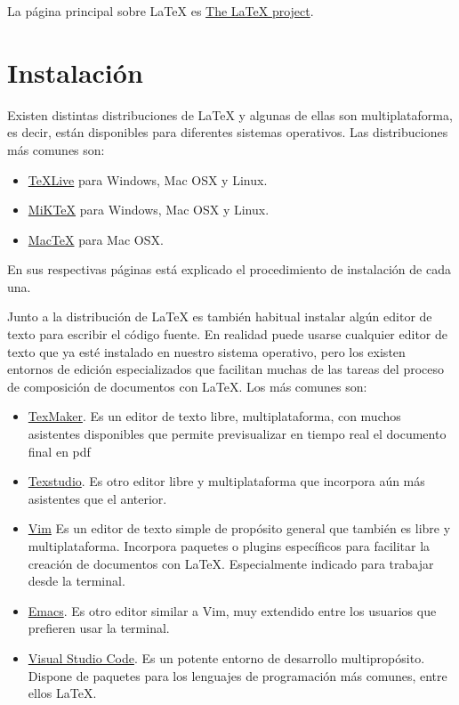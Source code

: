 \documentclass[
  spanish,
  a4paper,
]{scrreport}
\providecommand{\tightlist}{%
  \setlength{\itemsep}{0pt}\setlength{\parskip}{0pt}}
\theoremstyle{definition}
\theoremstyle{remark}
\begin{document}
La página principal sobre LaTeX es
\href{https://www.latex-project.org/}{The LaTeX project}.

\section{Instalación}\label{instalaciuxf3n}

Existen distintas distribuciones de LaTeX y algunas de ellas son
multiplataforma, es decir, están disponibles para diferentes sistemas
operativos. Las distribuciones más comunes son:

\begin{itemize}
\tightlist
\item
  \href{https://tug.org/texlive/}{TeXLive} para Windows, Mac OSX y
  Linux.
\item
  \href{}{MiKTeX} para Windows, Mac OSX y Linux.
\item
  \href{https://www.tug.org/mactex/}{MacTeX} para Mac OSX.
\end{itemize}

En sus respectivas páginas está explicado el procedimiento de
instalación de cada una.

Junto a la distribución de LaTeX es también habitual instalar algún
editor de texto para escribir el código fuente. En realidad puede usarse
cualquier editor de texto que ya esté instalado en nuestro sistema
operativo, pero los existen entornos de edición especializados que
facilitan muchas de las tareas del proceso de composición de documentos
con LaTeX. Los más comunes son:

\begin{itemize}
\tightlist
\item
  \href{http://www.xm1math.net/texmaker/}{TexMaker}. Es un editor de
  texto libre, multiplataforma, con muchos asistentes disponibles que
  permite previsualizar en tiempo real el documento final en pdf
\item
  \href{http://www.texstudio.org/}{Texstudio}. Es otro editor libre y
  multiplataforma que incorpora aún más asistentes que el anterior.
\item
  \href{https://www.vim.org/}{Vim} Es un editor de texto simple de
  propósito general que también es libre y multiplataforma. Incorpora
  paquetes o plugins específicos para facilitar la creación de
  documentos con LaTeX. Especialmente indicado para trabajar desde la
  terminal.
\item
  \href{https://www.gnu.org/software/emacs/}{Emacs}. Es otro editor
  similar a Vim, muy extendido entre los usuarios que prefieren usar la
  terminal.
\item
  \href{https://code.visualstudio.com/}{Visual Studio Code}. Es un
  potente entorno de desarrollo multipropósito. Dispone de paquetes para
  los lenguajes de programación más comunes, entre ellos LaTeX.
\end{itemize}
\end{document}
